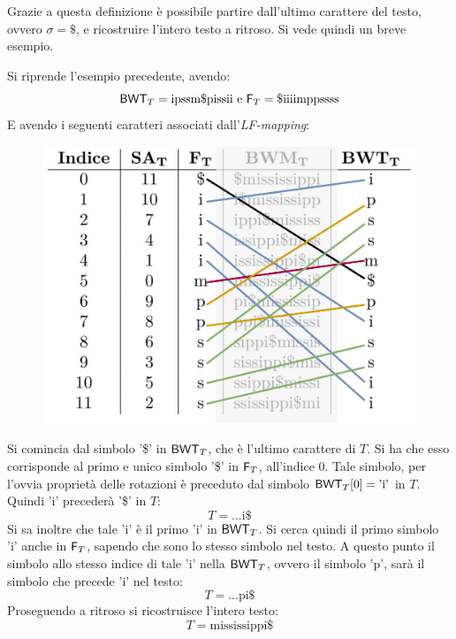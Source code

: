 Grazie a questa definizione è possibile partire dall'ultimo carattere del testo,
ovvero $\sigma=\$$, e ricostruire l'intero testo a ritroso. Si vede quindi un
breve esempio. 
\begin{esempio}
  Si riprende l'esempio precedente, avendo:
  \[\mbox{\rm {\sf BWT}}_T=\mbox{ipssm\$pissii}\mbox{ e }\mbox{\rm {\sf F}}_T=\mbox{\$iiiimppssss}\]
  E avendo i seguenti caratteri associati dall'\textit{LF-mapping}:
  \begin{figure}[H]
    \centering
    \includegraphics[scale = 0.33]{img/lf.pdf}
  \end{figure}
  Si comincia dal simbolo '\$' in $\mbox{\rm {\sf BWT}}_T$, che è l'ultimo carattere di $T$. Si
  ha che esso corrisponde al primo e unico simbolo '\$' in $\mbox{\rm {\sf F}}_T$, all'indice
  $0$. Tale simbolo, per l'ovvia proprietà delle rotazioni è preceduto dal
  simbolo $\mbox{\rm {\sf BWT}}_T[0]=\mbox{'i'}$ in $T$. Quindi $\mbox{'i'}$ precederà '\$' in
  $T$:
  \[T=\ldots\mbox{i\$}\]
  Si sa inoltre che
  tale $\mbox{'i'}$ è il primo $\mbox{'i'}$ in $\mbox{\rm {\sf BWT}}_T$. Si cerca quindi il
  primo simbolo $\mbox{'i'}$ anche in $\mbox{\rm {\sf F}}_T$,
  sapendo che sono lo stesso simbolo nel testo. A questo punto il simbolo allo
  stesso indice di tale $\mbox{'i'}$ nella $\mbox{\rm {\sf BWT}}_T$, ovvero il simbolo
  $\mbox{'p'}$, sarà il simbolo che precede $\mbox{'i'}$ nel testo:
  \[T=\ldots\mbox{pi\$}\]
  Proseguendo a ritroso si ricostruisce l'intero testo:
  \[T=\mbox{mississippi\$}\]
\end{esempio}
